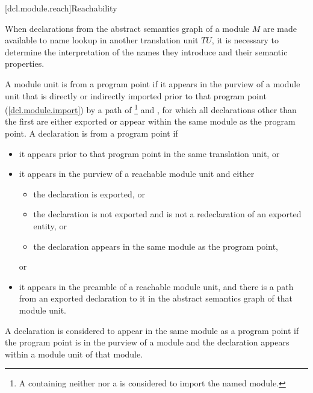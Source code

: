 [dcl.module.reach]{Reachability}

\begin{std.txt}\color{addclr}
  \resetalinea[0]
  \alinea
  When declarations from the abstract semantics graph of a module $M$
   are made available 
  to name lookup in another translation unit $TU$, it is necessary to
  determine the interpretation of the names they introduce and their
  semantic properties.
\begin{after}\color{addclr}
  \alinea
  A module unit is  from a program point if
  it appears in the purview of a module unit
  that is directly or indirectly imported prior to that program point (\ref{dcl.module.import})
  by a path of
  \footnote{\color{addclr}%
  A  containing neither 
  nor a  is considered to import the named module.}
  and
  ,
  for which all declarations other than the first
  are either exported or
  appear within the same module as the program point.
  A declaration is  from a program point if
  \begin{itemize}\color{addclr}
  \item it appears prior to that program point in the same translation unit, or
  \item it appears in the purview of a reachable module unit and either
  \begin{itemize}
  \item the declaration is exported, or 
  \item the declaration is not exported and is not a redeclaration of
  an exported entity, or
  \item the declaration appears in the same module as the program point,
  \end{itemize}
  or
  \item it appears in the preamble of a reachable module unit,
  and there is a path from an exported declaration to it
  in the abstract semantics graph of that module unit.
  \end{itemize}
  A declaration is considered to appear in the same module as a program point
  if the program point is in the purview of a module and
  the declaration appears within a module unit of that module.
\end{after}


\end{std.txt}
